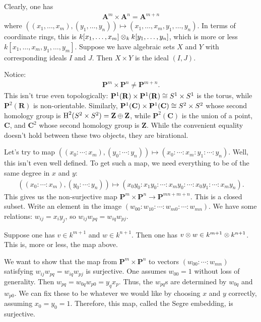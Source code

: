 \documentclass[11pt, oneside,margin=1in]{article}
\begin{document}
Clearly, one has
\begin{align*}
	\mathbf{A}^m \times \mathbf{A}^n = \mathbf{A}^{m+n}
\end{align*}
where $((x_1,\hdots,x_m),(y_1,\hdots,y_n))\longmapsto  (x_1,\hdots, x_m,y_1,\hdots, y_n)$. In terms of coordinate rings, this is $k[x_1,\hdots,x_m]\otimes_k k[y_1,\hdots, y_n]$, which is more or less $k[x_1,\hdots, x_m,y_1,\hdots, y_m]$. Suppose we have algebraic sets $X$ and $Y$ with corresponding ideals $I$ and $J$. Then $X\times Y$ is the ideal $(I,J)$.

Notice:
\begin{align*}
	\mathbf{P}^m \times \mathbf{P}^n\ne \mathbf{P}^{m+n}.
\end{align*}
This isn't true even topologically: $\mathbf{P}^1(\mathbf{R})\times \mathbf{P}^1(\mathbf{R})\cong S^1\times S^1$ is the torus, while $\mathbf{P}^2(\mathbf{R})$ is non-orientable. Similarly, $\mathbf{P}^1(\mathbf{C})\times \mathbf{P}^1(\mathbf{C})\cong S^2\times S^2$ whose second homology group is $\operatorname{H}^2(S^2\times S^2) =  \mathbf{Z}\oplus \mathbf{Z}$, while $\mathbf{P}^2(\mathbf{C})$ is the union of a point, $\mathbf{C}$, and $\mathbf{C}^2$ whose second homology group is $\mathbf{Z}$. While the convenient equality doesn't hold between these two objects, they are birational.

Let's try to map $((x_0:\cdots:x_m), (y_0:\cdots:y_n))\longmapsto (x_0:\cdots:x_m:y_1:\cdots:y_n)$. Well, this isn't even well defined. To get such a map, we need everything to be of the same degree in $x$ and $y$:
\begin{align*}
	((x_0:\cdots:x_m), (y_0:\cdots:y_n))\longmapsto (x_0y_0:x_1y_0:\cdots:x_my_0:\cdots: x_0y_1:\cdots:x_my_n).
\end{align*}
This gives us the non-surjective map $\mathbf{P}^m\times \mathbf{P}^n\longrightarrow \mathbf{P}^{mn+m+n}$. This is a closed subset. Write an element in the image $(w_{00}:w_{10}:\cdots: w_{m0} : \cdots: w_{mn})$. We have some relations: $w_{ij} = x_iy_j$, so $w_{ij}w_{pq}=w_{iq}w_{pj}$. 

Suppose one has $v\in k^{m+1}$ and $w\in k^{n+1}$. Then one has $v\otimes w \in k^{m+1}\otimes k^{n+1}$. This is, more or less, the map above.

We want to show that the map from $\mathbf{P}^m\times \mathbf{P}^n$ to vectors $(w_{00}:\cdots:w_{mn})$ satisfying $w_{ij}w_{pq}=w_{iq}w_{pj}$ is surjective. One assumes $w_{00}=1$ without loss of generality. Then $w_{pq} = w_{0q}w_{p0}=y_qx_p$. Thus, the $w_{pq}$s are determined by $ w_{0q}$ and $w_{p0}$. We can fix these to be whatever we would like by choosing $x$ and $y$ correctly, assuming $x_0=y_0=1$. Therefore, this map, called the Segre embedding, is surjective.
\end{document}

